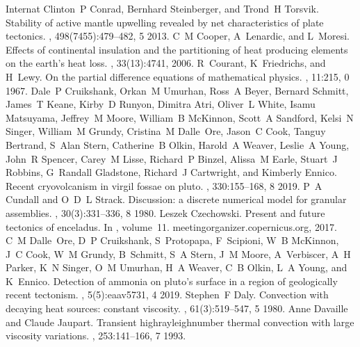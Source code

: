 \documentclass[letterpaper,10pt,english]{jupyterBook}
\begin{document}
\begin{sphinxthebibliography}{Internat}
\sphinxAtStartPar
Clinton P Conrad, Bernhard Steinberger, and Trond H Torsvik. Stability of active mantle upwelling revealed by net characteristics of plate tectonics. , 498(7455):479–482, 5 2013.
\sphinxAtStartPar
C M Cooper, A Lenardic, and L Moresi. Effects of continental insulation and the partitioning of heat producing elements on the earth's heat loss. , 33(13):4741, 2006.
\sphinxAtStartPar
R Courant, K Friedrichs, and H Lewy. On the partial difference equations of mathematical physics. , 11:215, 0 1967.
\sphinxAtStartPar
Dale P Cruikshank, Orkan M Umurhan, Ross A Beyer, Bernard Schmitt, James T Keane, Kirby D Runyon, Dimitra Atri, Oliver L White, Isamu Matsuyama, Jeffrey M Moore, William B McKinnon, Scott A Sandford, Kelsi N Singer, William M Grundy, Cristina M Dalle Ore, Jason C Cook, Tanguy Bertrand, S Alan Stern, Catherine B Olkin, Harold A Weaver, Leslie A Young, John R Spencer, Carey M Lisse, Richard P Binzel, Alissa M Earle, Stuart J Robbins, G Randall Gladstone, Richard J Cartwright, and Kimberly Ennico. Recent cryovolcanism in virgil fossae on pluto. , 330:155–168, 8 2019.
\sphinxAtStartPar
P A Cundall and O D L Strack. Discussion: a discrete numerical model for granular assemblies. , 30(3):331–336, 8 1980.
\sphinxAtStartPar
Leszek Czechowski. Present and future tectonics of enceladus. In , volume 11. meetingorganizer.copernicus.org, 2017.
\sphinxAtStartPar
C M Dalle Ore, D P Cruikshank, S Protopapa, F Scipioni, W B McKinnon, J C Cook, W M Grundy, B Schmitt, S A Stern, J M Moore, A Verbiscer, A H Parker, K N Singer, O M Umurhan, H A Weaver, C B Olkin, L A Young, and K Ennico. Detection of ammonia on pluto's surface in a region of geologically recent tectonism. , 5(5):eaav5731, 4 2019.
\sphinxAtStartPar
Stephen F Daly. Convection with decaying heat sources: constant viscosity. , 61(3):519–547, 5 1980.
\sphinxAtStartPar
Anne Davaille and Claude Jaupart. Transient high\sphinxhyphen{}rayleigh\sphinxhyphen{}number thermal convection with large viscosity variations. , 253:141–166, 7 1993.

\end{sphinxthebibliography}
\end{document}
